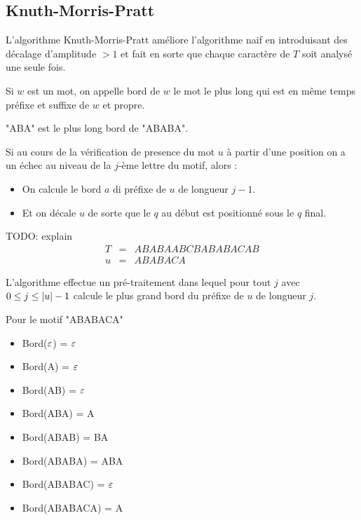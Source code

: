 \subsection{Knuth-Morris-Pratt}


L'algorithme Knuth-Morris-Pratt améliore l'algorithme naif en introduisant des décalage d'amplitude
$> 1$ et fait en sorte que chaque caractère de $T$ soit analysé une seule fois.

\iffalse
	\begin{itemize}
		\item Amélioration par rapport a l'algorithme naif:

		      L'algorithme ne prend en consideration que certains décalages
		      pour le motif en excluant les décalages où on ne pourra pas trouver le motif.
	\end{itemize}
\fi


\begin{definition}
	Si $w$ est un mot, on appelle bord de $w$ le mot le plus long qui est en même temps préfixe et suffixe de $w$ et propre.
\end{definition}

\begin{exemple}
	"ABA" est le plus long bord de "ABABA".
\end{exemple}

Si au cours de la vérification de presence du mot $u$ à partir d'une position
on a un échec au niveau de la $j$-ème lettre du motif, alors :

\begin{itemize}
	\item On calcule le bord $a$ di préfixe de $u$ de longueur $j-1$.
	\item Et on décale $u$ de sorte que le $q$ au début est positionné sous le $q$ final.
\end{itemize}

\begin{exemple}
	TODO: explain
	\begin{eqnarray*}
		T &=&  ABABAABCBABABACAB \\
		u &=& ABABACA
	\end{eqnarray*}
\end{exemple}


L'algorithme effectue un pré-traitement dans lequel pour tout $j$ avec $0 \leq j \leq |u| - 1$
calcule le plus grand bord du préfixe de $u$ de longueur $j$.

\begin{exemple}
	Pour le motif "ABABACA"
	\begin{itemize}
		\item Bord($\varepsilon$) = $\varepsilon$
		\item Bord(A) = $\varepsilon$
		\item Bord(AB) = $\varepsilon$
		\item Bord(ABA) = A
		\item Bord(ABAB) = BA
		\item Bord(ABABA) = ABA
		\item Bord(ABABAC) = $\varepsilon$
		\item Bord(ABABACA) = A
	\end{itemize}
\end{exemple}

